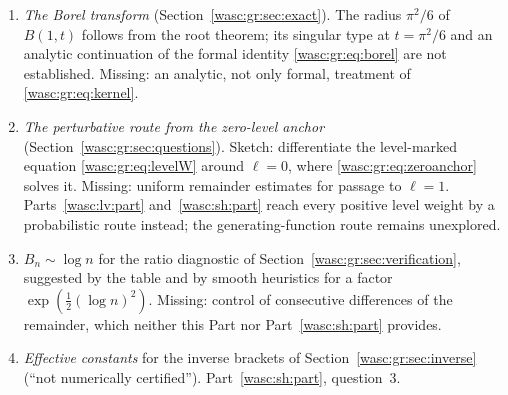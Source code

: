 \documentclass[11pt,a4paper]{article}
\theoremstyle{remark}\newtheorem{remark}[theorem]{Remark}
\numberwithin{equation}{section}
\begin{document}
\begin{enumerate}[leftmargin=*,itemsep=3pt]
\item \emph{The Borel transform} (Section~\ref{wasc:gr:sec:exact}). The radius $\pi^2/6$ of $B(1,t)$ follows from the root theorem; its singular type at $t=\pi^2/6$ and an analytic continuation of the formal identity \eqref{wasc:gr:eq:borel} are not established. Missing: an analytic, not only formal, treatment of \eqref{wasc:gr:eq:kernel}.
\item \emph{The perturbative route from the zero-level anchor} (Section~\ref{wasc:gr:sec:questions}). Sketch: differentiate the level-marked equation \eqref{wasc:gr:eq:levelW} around $\ell=0$, where \eqref{wasc:gr:eq:zeroanchor} solves it. Missing: uniform remainder estimates for passage to $\ell=1$. Parts~\ref{wasc:lv:part} and~\ref{wasc:sh:part} reach every positive level weight by a probabilistic route instead; the generating-function route remains unexplored.
\item \emph{$B_n\sim\log n$} for the ratio diagnostic of Section~\ref{wasc:gr:sec:verification}, suggested by the table and by smooth heuristics for a factor $\exp(\frac12(\log n)^2)$. Missing: control of consecutive differences of the remainder, which neither this Part nor Part~\ref{wasc:sh:part} provides.
\item \emph{Effective constants} for the inverse brackets of Section~\ref{wasc:gr:sec:inverse} (``not numerically certified''). Part~\ref{wasc:sh:part}, question~3.
\end{enumerate}

\clearpage
\end{document}
